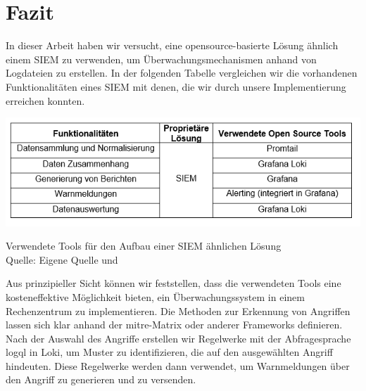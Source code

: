 \section{Fazit}


In dieser Arbeit haben wir versucht, eine \gls{opensource}-basierte Lösung ähnlich einem \gls{SIEM} zu verwenden, um Überwachungsmechanismen anhand von Logdateien zu erstellen. In der folgenden Tabelle vergleichen wir die vorhandenen Funktionalitäten eines \gls{SIEM} mit denen, die wir durch unsere Implementierung erreichen konnten.

\begin{table}[H]
    \includegraphics[width=\linewidth]{assets/tabelle_siem_BA.png}
    \caption{Verwendete Tools für den Aufbau einer \gls{SIEM} ähnlichen Lösung\\Quelle: Eigene Quelle und \citep{Granadillo_SIEM}}
 \end{table}
 

Aus prinzipieller Sicht können wir feststellen, dass die verwendeten Tools eine kosteneffektive Möglichkeit bieten, ein Überwachungssystem in einem Rechenzentrum zu implementieren. Die Methoden zur Erkennung von Angriffen lassen sich klar anhand der \gls{mitre}-Matrix oder anderer Frameworks definieren. Nach der Auswahl des Angriffe erstellen wir Regelwerke mit der Abfragesprache \gls{logql} in Loki, um Muster zu identifizieren, die auf den ausgewählten Angriff hindeuten. Diese Regelwerke werden dann verwendet, um Warnmeldungen über den Angriff zu generieren und zu versenden.


